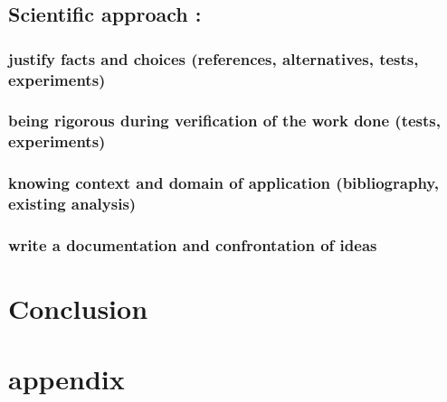 \documentclass{article}
\begin{document}
\subsection{Scientific approach :} 
\subsubsection{justify facts and choices (references, alternatives, tests, experiments)}
\subsubsection{being rigorous during verification of the work done (tests, experiments)}
\subsubsection{knowing context and domain of application (bibliography, existing analysis)}
\subsubsection{write a documentation and confrontation of ideas}

\section{Conclusion }

\section{appendix }
\end{document}
